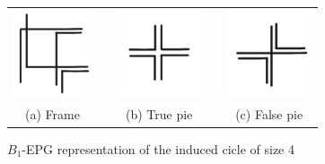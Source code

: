 

\begin{figure}[htb]
  \centering
  \begin{tabular}{c c c c c }
    \includegraphics[width=2.3cm]{./img/representacaociclotam41.png}  
    & &\includegraphics[width=2.5cm]{./img/representacaociclotam42.png} 
    & &
 \includegraphics[width=2.5cm]{./img/representacaociclotam43.png} \\%
    {\footnotesize (a) Frame}  & &  {\footnotesize (b) True pie} & & {\footnotesize (c) False pie} %
  \end{tabular}
  \caption{$B_{1}$-EPG representation of the induced cicle of size 4}\label{fig:ciclotam4}
\end{figure} 